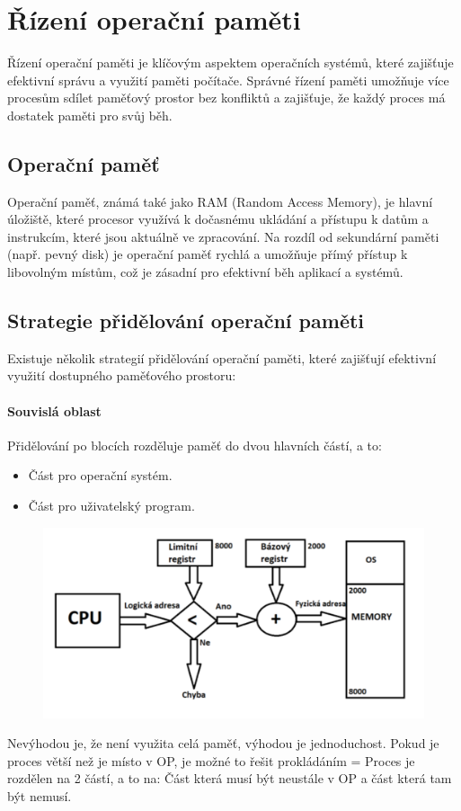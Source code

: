 \section{Řízení operační paměti}

Řízení operační paměti je klíčovým aspektem operačních systémů, které zajišťuje efektivní správu a využití paměti počítače. Správné řízení paměti umožňuje více procesům sdílet paměťový prostor bez konfliktů a zajišťuje, že každý proces má dostatek paměti pro svůj běh.

\subsection{Operační paměť}

Operační paměť, známá také jako RAM (Random Access Memory), je hlavní úložiště, které procesor využívá k dočasnému ukládání a přístupu k datům a instrukcím, které jsou aktuálně ve zpracování. Na rozdíl od sekundární paměti (např. pevný disk) je operační paměť rychlá a umožňuje přímý přístup k libovolným místům, což je zásadní pro efektivní běh aplikací a systémů.

\subsection{Strategie přidělování operační paměti}

Existuje několik strategií přidělování operační paměti, které zajišťují efektivní využití dostupného paměťového prostoru:

\paragraph{Souvislá oblast}
Přidělování po blocích rozděluje paměť do dvou hlavních částí, a to:
\begin{itemize}
    \item Část pro operační systém.
    \item Část pro uživatelský program.
\end{itemize}

\begin{figure}[h]
    \centering
    \includegraphics[scale=0.3]{sections/8_riz_op_pam/images/Screenshot 2024-08-26 121515.png}
 
\end{figure}
Nevýhodou je, že není využita celá paměť, výhodou je jednoduchost. Pokud je proces větší než je místo v OP, je možné to řešit prokládáním = Proces je rozdělen na 2 částí, a to na: Část která musí být neustále v OP a část která tam být nemusí.

